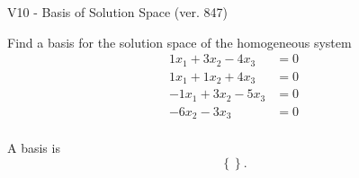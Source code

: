 \begin{exercise}
  \begin{exerciseTitle}V10 - Basis of Solution Space (ver. 847)\end{exerciseTitle}
  \begin{exerciseStatement}
    Find a basis for the solution space of the homogeneous system 
\begin{align*}
 1 x_ 1 + 3 x_ 2 -4 x_ 3 &= 0  \\ 
  1 x_ 1 + 1 x_ 2 + 4 x_ 3 &= 0  \\ 
  -1 x_ 1 + 3 x_ 2 -5 x_ 3 &= 0  \\ 
  -6 x_ 2 -3 x_ 3 &= 0  \\ 
 \end{align*}


 
  \end{exerciseStatement}

  \begin{exerciseAnswer}
   A basis is   
\[\left\{\right\}.\]

  


  \end{exerciseAnswer}
\end{exercise}